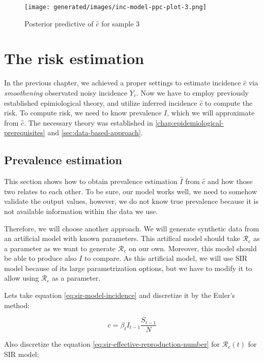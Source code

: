 \documentclass[
  digital, %
  oneside, %
  lof,     %
  lot,     %
]{fithesis4}
\begin{document}
\begin{figure}[H]
  \centering
  \texttt{[image: generated/images/inc-model-ppc-plot-3.png]}
  \caption{Posterior predictive of $\hat{c}$ for sample 3}
  \label{fig:incidence-posterior-3}
\end{figure}


\chapter{The risk estimation}

In the previous chapter, we achieved a proper settings
to estimate incidence $\hat{c}$ via \textit{smoothening}
observated noisy incidence $Y_c$.
Now we have to employ previously established epimiological theory,
and utilize inferred incidence $\hat{c}$ to compute the risk.
To compute risk, we need to know prevalence $I$, which we 
will approximate from $\hat{c}$.
The necessary theory was established in \autoref{chap:epidemiological-prerequisites} and \autoref{sec:data-based-approach}.


\section{Prevalence estimation}

This section shows how to obtain prevalence
estimation $\hat{I}$ from $\hat{c}$ and how those two relates to each other.
To be sure, our model works well, we need to somehow 
validate the output values, however, we do not know 
true prevalence because it is not available information within the data we use.

Therefore, we will choose another approach.
We will generate synthetic data from an artificial model
with known parameters.
This artifical model should take $\mathcal{R}_e$ as
a parameter as we want to generate $\mathcal{R}_e$ on our own.
Moreover, this model should be able to produce 
also $I$ to compare.
As this artificial model, we will use SIR model because 
of its large parametrization options, but 
we have to modify it to allow using 
$\mathcal{R}_e$ as a parameter.

Lets take equation \ref{eq:sir-model-incidence} and discretize it by the Euler's method:

\begin{equation}
  \label{eq:risk-model-incidence}
  c = \beta_t I_{t-1} \frac{S_{t-1}}{N}
\end{equation}

Also discretize the equation 
\eqref{eq:sir-effective-reproduction-number} for $\mathcal{R}_e(t)$ for SIR model:
\end{document}
